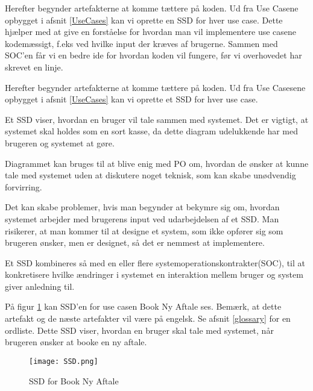 Herefter begynder artefakterne at komme tættere på koden. Ud fra Use Casene opbygget i afsnit \ref{UseCases} kan vi oprette en SSD for hver use case. Dette hjælper med at give en forståelse for hvordan man vil implementere use casene kodemæssigt, f.eks ved hvilke input der kræves af brugerne. Sammen med SOC'en får vi en bedre ide for hvordan koden vil fungere, før vi overhovedet har skrevet en linje.

Herefter begynder artefakterne at komme tættere på koden.
Ud fra Use Casesene opbygget i afsnit \ref{UseCases} kan vi oprette et SSD for hver use case.

Et SSD viser, hvordan en bruger vil tale sammen med systemet.
Det er vigtigt, at systemet skal holdes som en sort kasse, da dette diagram udelukkende har med brugeren og systemet at gøre.

Diagrammet kan bruges til at blive enig med PO om, hvordan de ønsker at kunne tale med systemet uden at diskutere noget teknisk, som kan skabe unødvendig forvirring.

Det kan skabe problemer, hvis man begynder at bekymre sig om, hvordan systemet arbejder med brugerens input ved udarbejdelsen af et SSD.
Man risikerer, at man kommer til at designe et system, som ikke opfører sig som brugeren ønsker, men er designet, så det er nemmest at implementere.

Et SSD kombineres så med en eller flere systemoperationskontrakter(SOC), til at konkretisere hvilke ændringer i systemet en interaktion mellem bruger og system giver anledning til.

På figur \ref{forretning:ssd} kan SSD'en for use casen Book Ny Aftale ses.
Bemærk, at dette artefakt og de næste artefakter vil være på engelsk.
Se afsnit \ref{glossary} for en ordliste.
Dette SSD viser, hvordan en bruger skal tale med systemet, når brugeren ønsker at booke en ny aftale.

\begin{figure}[H]
    \caption{SSD for Book Ny Aftale}
    \centering
        \texttt{[image: SSD.png]}
    \label{forretning:ssd}
\end{figure}
